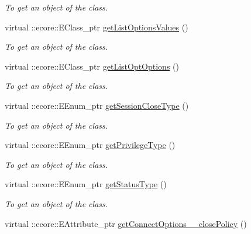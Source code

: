 \begin{DoxyCompactItemize}
\begin{DoxyCompactList}\small\item\em To get an object of the class. \item\end{DoxyCompactList}\item 
virtual ::ecore::EClass\_\-ptr \hyperlink{classUMS__Data_1_1UMS__DataPackage_a4b00add6b8be3db744601744f3d491af}{getListOptionsValues} ()
\begin{DoxyCompactList}\small\item\em To get an object of the class. \item\end{DoxyCompactList}\item 
virtual ::ecore::EClass\_\-ptr \hyperlink{classUMS__Data_1_1UMS__DataPackage_a96b96c3217b59d68d679d038a36293dd}{getListOptOptions} ()
\begin{DoxyCompactList}\small\item\em To get an object of the class. \item\end{DoxyCompactList}\item 
virtual ::ecore::EEnum\_\-ptr \hyperlink{classUMS__Data_1_1UMS__DataPackage_a2d5f8d28b9a8f6ee3b15d86d72317427}{getSessionCloseType} ()
\begin{DoxyCompactList}\small\item\em To get an object of the class. \item\end{DoxyCompactList}\item 
virtual ::ecore::EEnum\_\-ptr \hyperlink{classUMS__Data_1_1UMS__DataPackage_ae890e7935851e097fc6323dffa51344c}{getPrivilegeType} ()
\begin{DoxyCompactList}\small\item\em To get an object of the class. \item\end{DoxyCompactList}\item 
virtual ::ecore::EEnum\_\-ptr \hyperlink{classUMS__Data_1_1UMS__DataPackage_a3760478f0c1b6126e84adc2373e3308d}{getStatusType} ()
\begin{DoxyCompactList}\small\item\em To get an object of the class. \item\end{DoxyCompactList}\item 
virtual ::ecore::EAttribute\_\-ptr \hyperlink{classUMS__Data_1_1UMS__DataPackage_aae161c8c654e3bc83f474f97e2aa9d0b}{getConnectOptions\_\-\_\-closePolicy} ()

\end{DoxyCompactItemize}
